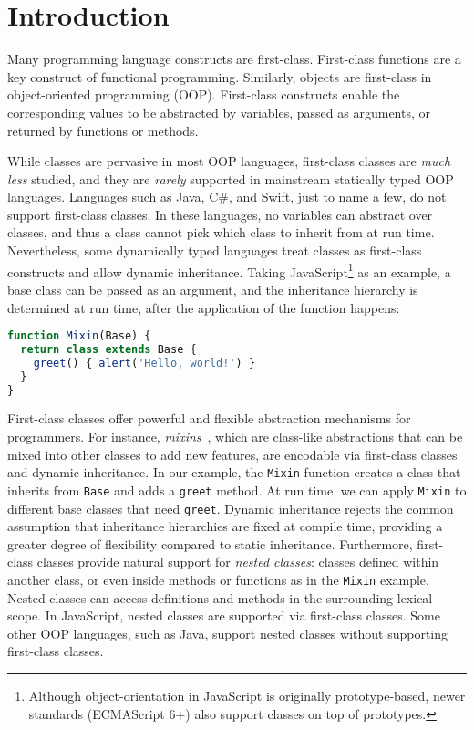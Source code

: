 \section{Introduction}

Many programming language constructs are first-class. First-class functions are
a key construct of functional programming. Similarly, objects are first-class in
object-oriented programming (OOP). First-class constructs enable the
corresponding values to be abstracted by variables, passed as arguments, or
returned by functions or methods.

While classes are pervasive in most OOP languages, first-class classes are
\emph{much less} studied, and they are \emph{rarely} supported in mainstream
statically typed OOP languages. Languages such as Java, C\#, and Swift, just to
name a few, do not support first-class classes. In these languages, no variables
can abstract over classes, and thus a class cannot pick which class to inherit
from at run time. Nevertheless, some dynamically typed languages treat classes
as first-class constructs and allow dynamic inheritance. Taking
JavaScript\footnote{Although object-orientation in JavaScript is originally
prototype-based, newer standards (ECMAScript 6+) also support classes on top of
prototypes.} as an example, a base class can be passed as an argument, and the
inheritance hierarchy is determined at run time, after the application of the
function happens:
\begin{lstlisting}[language=TypeScript]
function Mixin(Base) {
  return class extends Base {
    greet() { alert('Hello, world!') }
  }
}
\end{lstlisting}
First-class classes offer powerful and flexible abstraction mechanisms for
programmers. For instance, \emph{mixins}~\citep{bracha1990mixin}, which are
class-like abstractions that can be mixed into other classes to add new
features, are encodable via first-class classes and dynamic inheritance. In our
example, the \lstinline{Mixin} function creates a class that inherits from
\lstinline{Base} and adds a \lstinline{greet} method. At run time, we can apply
\lstinline{Mixin} to different base classes that need \lstinline{greet}. Dynamic
inheritance rejects the common assumption that inheritance hierarchies are fixed
at compile time, providing a greater degree of flexibility compared to static
inheritance. Furthermore, first-class classes provide natural support for
\emph{nested classes}: classes defined within another class, or even inside
methods or functions as in the \lstinline{Mixin} example. Nested classes can
access definitions and methods in the surrounding lexical scope. In JavaScript,
nested classes are supported via first-class classes. Some other OOP languages,
such as Java, support nested classes without supporting first-class classes.

